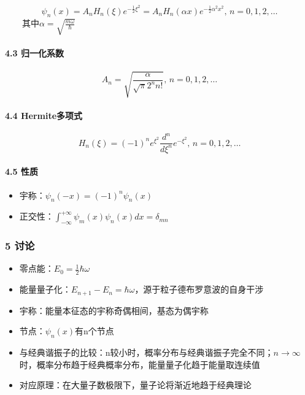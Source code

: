 \documentclass[UTF8,twocolumn]{ctexart}
\providecommand{\tightlist}{%
  \setlength{\itemsep}{0pt}\setlength{\parskip}{0pt}}
\let\oldparagraph\paragraph
\renewcommand{\paragraph}[1]{\oldparagraph{#1}\mbox{}}
\begin{document}
\[
\psi_n(x)=A_nH_n(\xi)e^{-\frac{1}{2}\xi^2}=A_nH_n(\alpha x)e^{-\frac{1}{2}\alpha^2x^2},\,n=0,1,2,\ldots
\]
  其中\(\alpha=\sqrt{\frac{m\omega}{\hbar}}\)

\hypertarget{ux5f52ux4e00ux5316ux7cfbux6570}{%
\paragraph{{ }4.3 归一化系数}\label{ux5f52ux4e00ux5316ux7cfbux6570}}

\[
A_n=\sqrt{\frac{\alpha}{\sqrt{\pi}2^nn!}},\,n=0,1,2,\ldots
\]

\hypertarget{hermiteux591aux9879ux5f0f}{%
\paragraph{{ }4.4 Hermite多项式}\label{hermiteux591aux9879ux5f0f}}

\[
H_n(\xi)=(-1)^ne^{\xi^2}\frac{d^n}{d\xi^n}e^{-\xi^2},\,n=0,1,2,\ldots
\]

\hypertarget{ux6027ux8d28}{%
\paragraph{{ }4.5 性质}\label{ux6027ux8d28}}

\begin{itemize}
\tightlist
\item
  宇称：\(\psi_n(-x)=(-1)^n\psi_n(x)\)
\item
  正交性：\(\int_{-\infty}^{+\infty}\psi_m(x)\psi_n(x)dx=\delta_{mn}\)
\end{itemize}

\hypertarget{ux8ba8ux8bba-6}{%
\subsubsection{5 讨论}\label{ux8ba8ux8bba-6}}

\begin{itemize}
\tightlist
\item
  零点能：\(E_0=\frac{1}{2}\hbar\omega\)
\item
  能量量子化：\(E_{n+1}-E_n=\hbar\omega\)，源于粒子德布罗意波的自身干涉
\item
  宇称：能量本征态的宇称奇偶相间，基态为偶宇称
\item
  节点：\(\psi_n(x)\)有n个节点
\item
  与经典谐振子的比较：n较小时，概率分布与经典谐振子完全不同；\(n\to\infty\)时，概率分布趋于经典概率分布，能量量子化趋于能量取连续值
\item
  对应原理：在大量子数极限下，量子论将渐近地趋于经典理论
\end{itemize}
\end{document}
